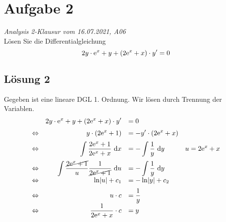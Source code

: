 \documentclass[main.tex]{subfiles}
\begin{document}
\section{Aufgabe 2}
\textit{Analysis 2-Klausur vom 16.07.2021, A06}\\
Lösen Sie die Differentialgleichung
\begin{equation*}
	2y \cdot \mathrm{e}^x + y + (2\mathrm{e}^x + x) \cdot y' = 0
\end{equation*}
\subsection{Lösung 2}
Gegeben ist eine lineare DGL 1. Ordnung. Wir lösen durch Trennung der Variablen.
\[\everymath={\displaystyle}\begin{array}{crll}
				& 2y \cdot \ct{e}^x + y + \left(2\ct{e}^x + x\right) \cdot y' &= 0 & \\[2mm]
\Leftrightarrow & y\cdot \left(2\ct{e}^x + 1\right) &= - y' \cdot \left(2\ct{e}^x + x\right) & \\[2mm]
\Leftrightarrow & \int \frac{2\ct{e}^x + 1}{2\ct{e}^x + x} \dx{x} &= - \int \frac{1}{y} \dx{y} & u = 2\ct{e}^x+x \\[4mm]
\Leftrightarrow & \int \frac{\cancel{2\ct{e}^x + 1}}{u} \frac{1}{\cancel{2\ct{e}^x+1}} \dx{u} &= - \int \frac{1}{y} \dx{y} \\[2mm]
\Leftrightarrow & \ln\abs{u} + c_1 &= - \ln \abs{y} + c_2 \\[2mm]
\Leftrightarrow & u \cdot c &= \frac{1}{y} \\[2mm]
\Leftrightarrow & \frac{1}{2\ct{e}^x+x} \cdot c &= y \\[2mm]
\end{array}\]
\end{document}
